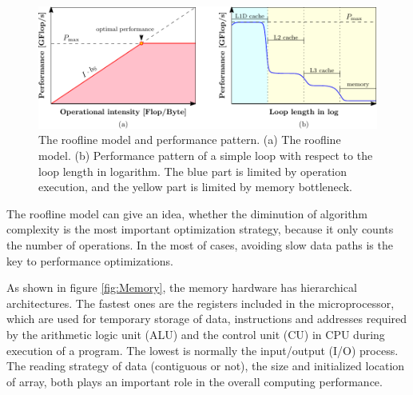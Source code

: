 \begin{figure}[h]
\begin{centering}
\includegraphics[width=1\columnwidth]{_figure/roofline}
\par\end{centering}

\caption[The roofline model and performance pattern]{The roofline model and performance pattern. (a) The roofline model.
(b) Performance pattern of a simple loop with respect to the loop
length in logarithm. The blue part is limited by operation execution,
and the yellow part is limited by memory bottleneck. \label{fig:The-roofline-model}}
\end{figure}


The roofline model can give an idea, whether the diminution of algorithm
complexity is the most important optimization strategy, because it
only counts the number of operations. In the most of cases, avoiding
slow data paths is the key to performance optimizations.

As shown in figure \ref{fig:Memory}, the memory hardware has hierarchical
architectures. The fastest ones are the registers included in the
microprocessor, which are used for temporary storage of data, instructions
and addresses required by the arithmetic logic unit (ALU) and the
control unit (CU) in CPU during execution of a program. The lowest
is normally the input/output (I/O) process. The reading strategy of
data (contiguous or not), the size and initialized location of array,
both plays an important role in the overall computing performance. 

